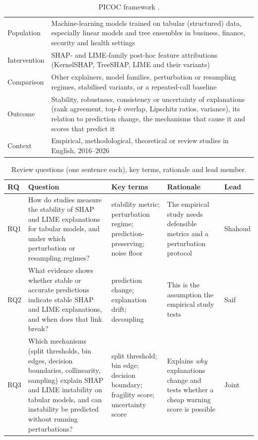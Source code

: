 \begin{table}[H]
\centering\small
\caption{PICOC framework \cite{petticrew2006}.}\label{tab:picoc}
\begin{tabularx}{\textwidth}{@{}P{2.3cm}L@{}}
\toprule
Population & Machine-learning models trained on tabular (structured) data, especially linear models and tree ensembles in business, finance, security and health settings \\
Intervention & SHAP- and LIME-family post-hoc feature attributions (KernelSHAP, TreeSHAP, LIME and their variants) \\
Comparison & Other explainers, model families, perturbation or resampling regimes, stabilised variants, or a repeated-call baseline \\
Outcome & Stability, robustness, consistency or uncertainty of explanations (rank agreement, top-$k$ overlap, Lipschitz ratios, variance), its relation to prediction change, the mechanisms that cause it and scores that predict it \\
Context & Empirical, methodological, theoretical or review studies in English, 2016--2026 \\
\bottomrule
\end{tabularx}
\end{table}
\vspace{-6pt}
\begin{table}[H]
\centering\small
\caption{Review questions (one sentence each), key terms, rationale and lead member.}\label{tab:rq}
\begin{tabularx}{\textwidth}{@{}P{0.75cm}P{5.6cm}P{3.2cm}LP{1.2cm}@{}}
\toprule
RQ & Question & Key terms & Rationale & Lead \\ \midrule
RQ1 & How do studies measure the stability of SHAP and LIME explanations for tabular models, and under which perturbation or resampling regimes? & stability metric; perturbation regime; prediction-preserving; noise floor & The empirical study needs defensible metrics and a perturbation protocol & Shahoud \\
RQ2 & What evidence shows whether stable or accurate predictions indicate stable SHAP and LIME explanations, and when does that link break? & prediction change; explanation drift; decoupling & This is the assumption the empirical study tests & Saif \\
RQ3 & Which mechanisms (split thresholds, bin edges, decision boundaries, collinearity, sampling) explain SHAP and LIME instability on tabular models, and can instability be predicted without running perturbations? & split threshold; bin edge; decision boundary; fragility score; uncertainty score & Explains \textit{why} explanations change and tests whether a cheap warning score is possible & Joint \\
\bottomrule
\end{tabularx}
\end{table}
